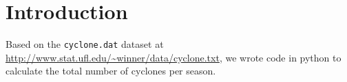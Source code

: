 \section{Introduction}
\noindent
Based on the \texttt{cyclone.dat} dataset at 
\url{http://www.stat.ufl.edu/~winner/data/cyclone.txt}, 
we wrote code in python to calculate 
the total number of cyclones per season.
